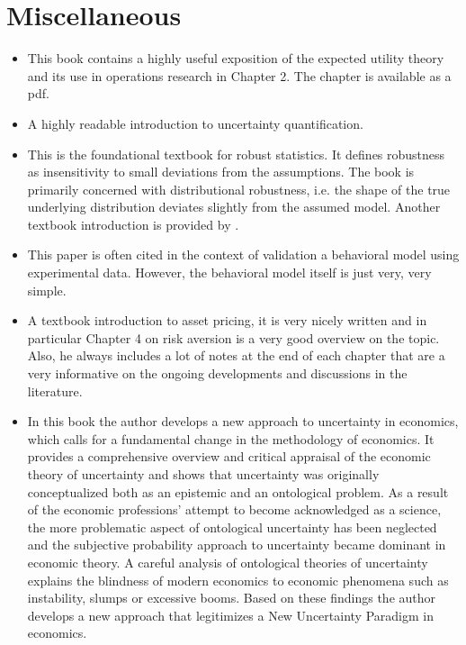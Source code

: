 \section*{Miscellaneous}
\begin{itemize}
\item {}

This book contains a highly useful exposition of the expected utility theory and its use in operations research in Chapter 2. The chapter is available as a pdf.

\item {}

A highly readable introduction to uncertainty quantification.

\item {}

This is the foundational textbook for robust statistics. It defines robustness as insensitivity to small deviations from the assumptions. The book is primarily concerned with distributional robustness, i.e. the shape of the true underlying distribution deviates slightly from the assumed model. Another textbook introduction is provided by \citet{Maronna.2006}.

\item {}

This paper is often cited in the context of validation a behavioral model using experimental data. However, the behavioral model itself is just very, very simple.

\item {}

A textbook introduction to asset pricing, it is very nicely written and in particular Chapter 4 on risk aversion is a very good overview on the topic. Also,  he always includes a lot of notes at the end of each chapter that are a very informative on the ongoing developments and discussions in the literature.

\item {}

In this book the author develops a new approach to uncertainty in economics, which calls for a fundamental change in the methodology of economics. It provides a comprehensive overview and critical appraisal of the economic theory of uncertainty and shows that uncertainty was originally conceptualized both as an epistemic and an ontological problem. As a result of the economic professions' attempt to become acknowledged as a science, the more problematic aspect of ontological uncertainty has been neglected and the subjective probability approach to uncertainty became dominant in economic theory. A careful analysis of ontological theories of uncertainty explains the blindness of modern economics to economic phenomena such as instability, slumps or excessive booms. Based on these findings the author develops a new approach that legitimizes a New Uncertainty Paradigm in economics.


\end{itemize}
